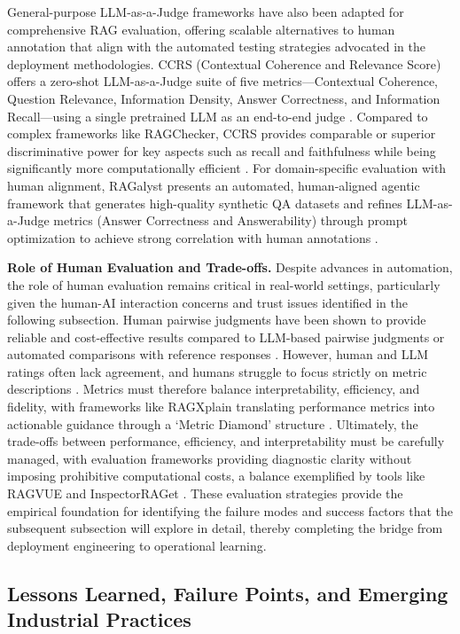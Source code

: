 \documentclass[11pt]{article}
\begin{document}
General-purpose LLM-as-a-Judge frameworks have also been adapted for comprehensive RAG evaluation, offering scalable alternatives to human annotation that align with the automated testing strategies advocated in the deployment methodologies. CCRS (Contextual Coherence and Relevance Score) offers a zero-shot LLM-as-a-Judge suite of five metrics---Contextual Coherence, Question Relevance, Information Density, Answer Correctness, and Information Recall---using a single pretrained LLM as an end-to-end judge \cite{ref406}. Compared to complex frameworks like RAGChecker, CCRS provides comparable or superior discriminative power for key aspects such as recall and faithfulness while being significantly more computationally efficient \cite{ref406}. For domain-specific evaluation with human alignment, RAGalyst presents an automated, human-aligned agentic framework that generates high-quality synthetic QA datasets and refines LLM-as-a-Judge metrics (Answer Correctness and Answerability) through prompt optimization to achieve strong correlation with human annotations \cite{ref588}.

\textbf{Role of Human Evaluation and Trade-offs.} Despite advances in automation, the role of human evaluation remains critical in real-world settings, particularly given the human-AI interaction concerns and trust issues identified in the following subsection. Human pairwise judgments have been shown to provide reliable and cost-effective results compared to LLM-based pairwise judgments or automated comparisons with reference responses \cite{ref589}. However, human and LLM ratings often lack agreement, and humans struggle to focus strictly on metric descriptions \cite{ref78}. Metrics must therefore balance interpretability, efficiency, and fidelity, with frameworks like RAGXplain translating performance metrics into actionable guidance through a `Metric Diamond' structure \cite{ref415}. Ultimately, the trade-offs between performance, efficiency, and interpretability must be carefully managed, with evaluation frameworks providing diagnostic clarity without imposing prohibitive computational costs, a balance exemplified by tools like RAGVUE and InspectorRAGet \cite{ref417,ref590}. These evaluation strategies provide the empirical foundation for identifying the failure modes and success factors that the subsequent subsection will explore in detail, thereby completing the bridge from deployment engineering to operational learning.

\subsection{Lessons Learned, Failure Points, and Emerging Industrial Practices}
\end{document}
